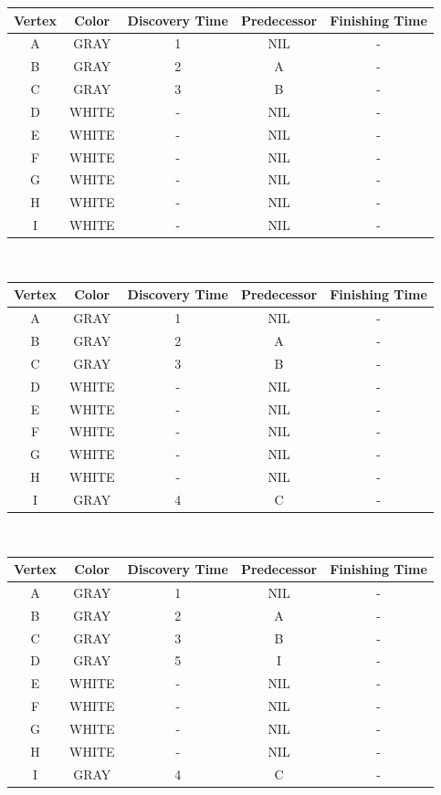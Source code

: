 \documentclass[12pt]{article}
\theoremstyle{plain}
\newcommand{\vs}{\vspace{2mm}}
\begin{document}
\begin{tabular}{|c|c|c|c|c|}
    \hline
    Vertex & Color & Discovery Time & Predecessor & Finishing Time \\ \hline
    A & GRAY & 1 & NIL & - \\ \hline
    B & GRAY & 2 & A & - \\ \hline
    C & GRAY & 3 & B & - \\ \hline
    D & WHITE & - & NIL & - \\ \hline
    E & WHITE & - & NIL & - \\ \hline
    F & WHITE & - & NIL & - \\ \hline
    G & WHITE & - & NIL & - \\ \hline
    H & WHITE & - & NIL & - \\ \hline
    I & WHITE & - & NIL & - \\ \hline
\end{tabular}
\vs\
\newpage
{}
\begin{tabular}{|c|c|c|c|c|}
    \hline
    Vertex & Color & Discovery Time & Predecessor & Finishing Time \\ \hline
    A & GRAY & 1 & NIL & - \\ \hline
    B & GRAY & 2 & A & - \\ \hline
    C & GRAY & 3 & B & - \\ \hline
    D & WHITE & - & NIL & - \\ \hline
    E & WHITE & - & NIL & - \\ \hline
    F & WHITE & - & NIL & - \\ \hline
    G & WHITE & - & NIL & - \\ \hline
    H & WHITE & - & NIL & - \\ \hline
    I & GRAY & 4 & C & - \\ \hline
\end{tabular}
\vs\

\begin{tabular}{|c|c|c|c|c|}
    \hline
    Vertex & Color & Discovery Time & Predecessor & Finishing Time \\ \hline
    A & GRAY & 1 & NIL & - \\ \hline
    B & GRAY & 2 & A & - \\ \hline
    C & GRAY & 3 & B & - \\ \hline
    D & GRAY & 5 & I & - \\ \hline
    E & WHITE & - & NIL & - \\ \hline
    F & WHITE & - & NIL & - \\ \hline
    G & WHITE & - & NIL & - \\ \hline
    H & WHITE & - & NIL & - \\ \hline
    I & GRAY & 4 & C & - \\ \hline
\end{tabular}
\vs\
\end{document}
